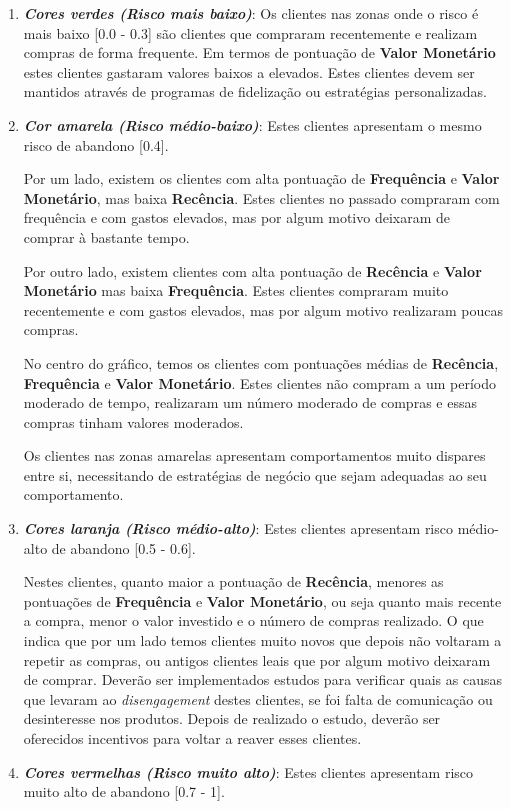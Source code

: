 \documentclass{easychair}
\begin{document}
\begin{enumerate}
	\item \textit{\textbf{Cores verdes (Risco mais baixo)}}: Os clientes nas zonas onde o risco é mais baixo [0.0 - 0.3] são clientes que compraram recentemente e realizam compras de forma frequente. Em termos de pontuação de \textbf{Valor Monetário} estes clientes gastaram valores baixos a elevados. Estes clientes devem ser mantidos através de programas de fidelização ou estratégias personalizadas.
	\item \textit{\textbf{Cor amarela (Risco médio-baixo)}}: Estes clientes apresentam o mesmo risco de abandono [0.4].

Por um lado, existem os clientes com alta pontuação de \textbf{Frequência} e \textbf{Valor Monetário}, mas baixa \textbf{Recência}. Estes clientes no passado compraram com frequência e com gastos elevados, mas por algum motivo deixaram de comprar à bastante tempo.

Por outro lado, existem clientes com alta pontuação de \textbf{Recência} e \textbf{Valor Monetário} mas baixa \textbf{Frequência}. Estes clientes compraram muito recentemente e com gastos elevados, mas por algum motivo realizaram poucas compras.

No centro do gráfico, temos os clientes com pontuações médias de \textbf{Recência}, \textbf{Frequência} e \textbf{Valor Monetário}. Estes clientes não compram a um período moderado de tempo, realizaram um número moderado de compras e essas compras tinham valores moderados.

Os clientes nas zonas amarelas apresentam comportamentos muito dispares entre si, necessitando de estratégias de negócio que sejam adequadas ao seu comportamento.
	\item \textit{\textbf{Cores laranja (Risco médio-alto)}}: Estes clientes apresentam risco médio-alto de abandono [0.5 - 0.6].

Nestes clientes, quanto maior a pontuação de \textbf{Recência}, menores as pontuações de \textbf{Frequência} e \textbf{Valor Monetário}, ou seja quanto mais recente a compra, menor o valor investido e o número de compras realizado. O que indica que por um lado temos clientes muito novos que depois não voltaram a repetir as compras, ou antigos clientes leais que por algum motivo deixaram de comprar. Deverão ser implementados estudos para verificar quais as causas que levaram ao \textit{disengagement} destes clientes, se foi falta de comunicação ou desinteresse nos produtos. Depois de realizado o estudo, deverão ser oferecidos incentivos para voltar a reaver esses clientes.
	\item \textit{\textbf{Cores vermelhas (Risco muito alto)}}: Estes clientes apresentam risco muito alto de abandono [0.7 - 1].


\end{enumerate}
\end{document}
